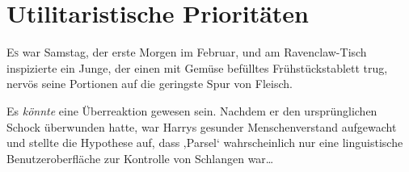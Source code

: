 \chapter{Utilitaristische Prioritäten}

\lettrine{E}{s} war Samstag, der erste Morgen im Februar, und am Ravenclaw-Tisch inspizierte ein Junge, der einen mit Gemüse befülltes Frühstückstablett trug, nervös seine Portionen auf die geringste Spur von Fleisch.

Es \emph{könnte} eine Überreaktion gewesen sein. Nachdem er den ursprünglichen Schock überwunden hatte, war Harrys gesunder Menschenverstand aufgewacht und stellte die Hypothese auf, dass ‚Parsel‘ wahrscheinlich nur eine linguistische Benutzeroberfläche zur Kontrolle von Schlangen war…

